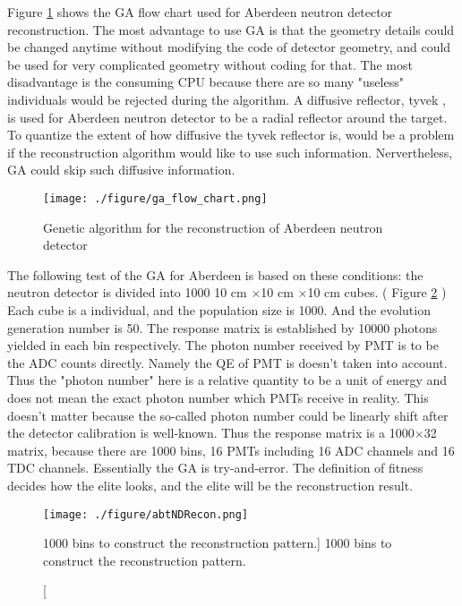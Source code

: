 Figure \ref{ga_flow_chart.png} shows the GA flow chart used for Aberdeen neutron detector reconstruction.
The most advantage to use GA is that the geometry details could be changed anytime without modifying the code of detector geometry,
and could be used for very complicated geometry without coding for that. The most disadvantage is the consuming
CPU because there are so many "useless" individuals would be rejected during the algorithm.
A diffusive reflector, tyvek
, is used for Aberdeen neutron detector to
be a radial reflector around the target. To quantize the extent of how diffusive the tyvek reflector is, would be a problem
if the reconstruction algorithm would like to use such information.
Nervertheless, GA could skip such diffusive information.


\begin{figure}
    \centering
    \texttt{[image: ./figure/ga\_flow\_chart.png]}
    \caption{Genetic algorithm for the reconstruction of Aberdeen neutron detector}
    \label{ga_flow_chart.png}
    \end{figure}


The following test of the GA for Aberdeen is based on these conditions:
the neutron detector is divided into 1000 10 cm $\times$10 cm $\times$10 cm cubes. ( Figure \ref{fig:abtNDRecon.png} )
Each cube is a individual, and the population size is 1000.
And the evolution generation number is 50.
The response matrix is established by 10000 photons yielded in each bin respectively.
The photon number received by PMT is to be the ADC counts directly.
Namely the QE of PMT is doesn't taken into account.
Thus the "photon number" here is a relative quantity to be a unit of energy and does not mean the exact
photon number which PMTs receive in reality.
This doesn't matter because the so-called photon number could be linearly shift after the
detector calibration is well-known.
Thus the response matrix is a 1000$\times$32 matrix, because there are 1000 bins, 16 PMTs including
16 ADC channels and 16 TDC channels.
Essentially the GA is try-and-error.
The definition of fitness decides how the elite looks, and the elite
will be the reconstruction result.

\begin{figure}
    \centering
    \texttt{[image: ./figure/abtNDRecon.png]}
    \caption
    [1000 bins to construct the reconstruction pattern.]
    {1000 bins to construct the reconstruction pattern.}
    \label{fig:abtNDRecon.png}
    \end{figure}



